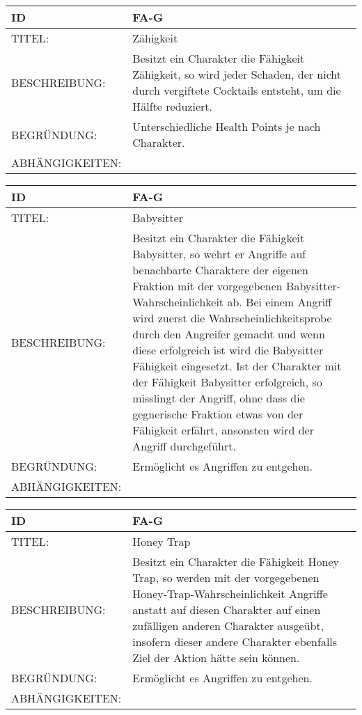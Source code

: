 \begin{tabularx}{16cm}{l|X}
	{table}\label{Zaehigkeit}
	\textbf{ID} & \textbf{FA-G \arabic{table}} \\
	\hline
	TITEL: & Zähigkeit \\
	\hline
	BESCHREIBUNG: & Besitzt ein Charakter die Fähigkeit Zähigkeit, so wird jeder Schaden, der nicht durch vergiftete Cocktails entsteht, um die Hälfte reduziert.\\
	\hline
	BEGRÜNDUNG: & Unterschiedliche Health Points je nach Charakter.\\
	\hline
	ABHÄNGIGKEITEN: & \\
\end{tabularx}

\begin{tabularx}{16cm}{l|X}
	{table}\label{Babysitter}
	\textbf{ID} & \textbf{FA-G \arabic{table}} \\
	\hline
	TITEL: & Babysitter \\
	\hline
	BESCHREIBUNG: & Besitzt ein Charakter die Fähigkeit Babysitter, so wehrt er Angriffe auf benachbarte Charaktere der eigenen Fraktion mit der vorgegebenen Babysitter-Wahrscheinlichkeit ab. Bei einem Angriff wird zuerst die Wahrscheinlichkeitsprobe durch den Angreifer gemacht und wenn diese erfolgreich ist wird die Babysitter Fähigkeit eingesetzt. Ist der Charakter mit der Fähigkeit Babysitter erfolgreich, so misslingt der Angriff, ohne dass die gegnerische Fraktion etwas von der Fähigkeit erfährt, ansonsten wird der Angriff durchgeführt.\\
	\hline
	BEGRÜNDUNG: & Ermöglicht es Angriffen zu entgehen.\\
	\hline
	ABHÄNGIGKEITEN: & \\
\end{tabularx}

\begin{tabularx}{16cm}{l|X}
	{table}\label{Honey Trap}
	\textbf{ID} & \textbf{FA-G \arabic{table}} \\
	\hline
	TITEL: & Honey Trap \\
	\hline
	BESCHREIBUNG: & Besitzt ein Charakter die Fähigkeit Honey Trap, so werden mit der vorgegebenen Honey-Trap-Wahrscheinlichkeit Angriffe anstatt auf diesen Charakter auf einen zufälligen anderen Charakter ausgeübt, insofern dieser andere Charakter ebenfalls Ziel der Aktion hätte sein können.\\
	\hline
	BEGRÜNDUNG: & Ermöglicht es Angriffen zu entgehen.\\
	\hline
	ABHÄNGIGKEITEN: & \\
\end{tabularx}

